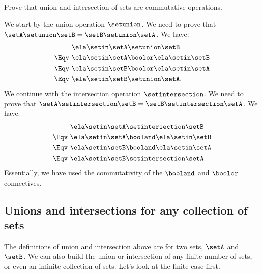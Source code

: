 \begin{exercise}
    Prove that union and intersection of sets are commutative operations.
\end{exercise}

\begin{solution}
    We start by the union operation $\setunion$.
    We need to prove that $\setA \setunion \setB = \setB \setunion \setA$.
    We have:
    \begin{equation*}
        \begin{split}
                    & \ela \setin \setA \setunion \setB           \\
            \Eqv \  & \ela \setin \setA \boolor \ela \setin \setB \\
            \Eqv \  & \ela \setin \setB \boolor \ela \setin \setA \\
            \Eqv \  & \ela \setin \setB \setunion \setA.
        \end{split}
    \end{equation*}
    We continue with the intersection operation $\setintersection$.
    We need to prove that $\setA \setintersection \setB = \setB \setintersection \setA$.
    We have:
    \begin{equation*}
        \begin{split}
                    & \ela \setin \setA \setintersection \setB     \\
            \Eqv \  & \ela \setin \setA \booland \ela \setin \setB \\
            \Eqv \  & \ela \setin \setB \booland \ela \setin \setA \\
            \Eqv \  & \ela \setin \setB \setintersection \setA.
        \end{split}
    \end{equation*}
    Essentially, we have used the commutativity of the $\booland$ and $\boolor$ connectives.
\end{solution}

\subsection{Unions and intersections for any collection of sets}

The definitions of union and intersection above are for two sets, $\setA$ and $\setB$.
We can also build the union or intersection of any finite number of sets, or even an infinite collection of sets.
Let's look at the finite case first.

